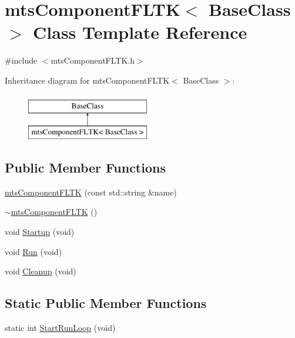 \hypertarget{classmts_component_f_l_t_k}{\section{mts\-Component\-F\-L\-T\-K$<$ Base\-Class $>$ Class Template Reference}
\label{classmts_component_f_l_t_k}
}


{\ttfamily \#include $<$mts\-Component\-F\-L\-T\-K.\-h$>$}

Inheritance diagram for mts\-Component\-F\-L\-T\-K$<$ Base\-Class $>$\-:\begin{figure}[H]
\begin{center}
\leavevmode
\includegraphics[height=2.000000cm]{d3/d56/classmts_component_f_l_t_k}
\end{center}
\end{figure}
\subsection*{Public Member Functions}
\begin{DoxyCompactItemize}
\item 
\hyperlink{classmts_component_f_l_t_k_a704219af0408a6490f6dd037dc875610}{mts\-Component\-F\-L\-T\-K} (const std\-::string \&name)
\item 
\hyperlink{classmts_component_f_l_t_k_a431ee9a69494cf3d8edeedb9039f7ddd}{$\sim$mts\-Component\-F\-L\-T\-K} ()
\item 
void \hyperlink{classmts_component_f_l_t_k_a1414000961f52e0ab76f141300e2fef1}{Startup} (void)
\item 
void \hyperlink{classmts_component_f_l_t_k_a80d9a8450d5f28207f644682a426b6b9}{Run} (void)
\item 
void \hyperlink{classmts_component_f_l_t_k_a448f78d704dbd18ff4b678eb19f037db}{Cleanup} (void)
\end{DoxyCompactItemize}
\subsection*{Static Public Member Functions}
\begin{DoxyCompactItemize}
\item 
static int \hyperlink{classmts_component_f_l_t_k_a0dca571982b439a230c32b38e1939da7}{Start\-Run\-Loop} (void)
\end{DoxyCompactItemize}


